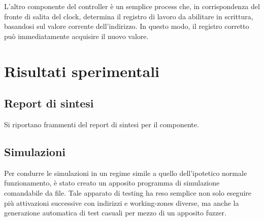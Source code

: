 \documentclass[11pt,a4paper]{article}
\begin{document}
L'altro componente del controller è un semplice process che, in corrispondenza del fronte di salita del clock, determina il registro di lavoro da abilitare
in scrittura, basandosi sul valore corrente dell'indirizzo. In questo modo, il registro corretto può immediatamente acquisire il nuovo valore.

\section{Risultati sperimentali}

\subsection{Report di sintesi}
Si riportano frammenti del report di sintesi per il componente.


\begin{minipage}{\linewidth}
    
\end{minipage}

\begin{minipage}{\linewidth}
    
\end{minipage}

\begin{minipage}{\linewidth}
    
\end{minipage}

\subsection{Simulazioni}
Per condurre le simulazioni in un regime simile a quello dell'ipotetico normale funzionamento, è stato creato un apposito programma di simulazione
comandabile da file. Tale apparato di testing ha reso semplice non solo eseguire più attivazioni successive con indirizzi e working-zones diverse, ma anche
la generazione automatica di test casuali per mezzo di un apposito fuzzer.
\end{document}
